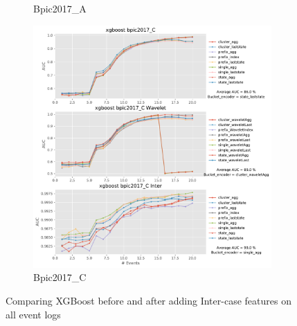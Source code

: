 \documentclass[twoside,11pt]{Latex/Classes/PhDthesisPSnPDF}
\begin{document}
\begin{figure}[!htbp]
\begin{subfigure}{0.48\textwidth}
		\caption{Bpic2017\_A} \label{fig:b17ai}
	\end{subfigure}\hspace*{\fill}
	\begin{subfigure}{0.48\textwidth}
		\includegraphics[width=\linewidth]{images/inter/xgboost/bpic2017_C.pdf}
		\caption{Bpic2017\_C} \label{fig:b17ci}
	\end{subfigure}	
\caption{Comparing XGBoost before and after adding Inter-case features on all event logs}
\label{fig:interx1}
\end{figure}
\end{document}
